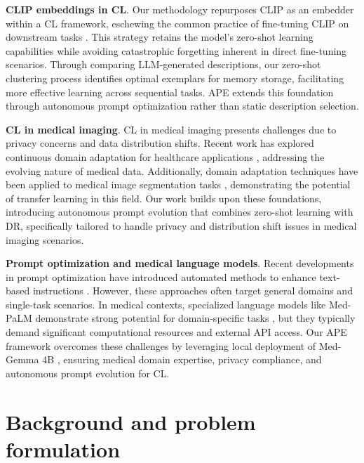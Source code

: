 \documentclass[pdflatex,sn-mathphys-num]{sn-jnl}%
\theoremstyle{thmstyleone}%
\theoremstyle{thmstyletwo}%
\theoremstyle{thmstylethree}%
\begin{document}
\noindent\textbf{CLIP embeddings in CL}. Our methodology repurposes CLIP as an embedder within a CL framework, eschewing the common practice of fine-tuning CLIP on downstream tasks \cite{TiCCLIP}. This strategy retains the model's zero-shot learning capabilities while avoiding catastrophic forgetting inherent in direct fine-tuning scenarios. Through comparing LLM-generated descriptions, our zero-shot clustering process identifies optimal exemplars for memory storage, facilitating more effective learning across sequential tasks. APE extends this foundation through autonomous prompt optimization rather than static description selection.

\noindent\textbf{CL in medical imaging}. CL in medical imaging presents challenges due to privacy concerns and data distribution shifts. Recent work has explored continuous domain adaptation for healthcare applications \cite{venkataramani2018continuousdomainadaptationhealthcare}, addressing the evolving nature of medical data. Additionally, domain adaptation techniques have been applied to medical image segmentation tasks \cite{valindria2018domainadaptationmriorgan}, demonstrating the potential of transfer learning in this field. Our work builds upon these foundations, introducing autonomous prompt evolution that combines zero-shot learning with DR, specifically tailored to handle privacy and distribution shift issues in medical imaging scenarios.

\noindent\textbf{Prompt optimization and medical language models}. Recent developments in prompt optimization have introduced automated methods to enhance text-based instructions \cite{zhou2024systematicsurveypromptengineering}. However, these approaches often target general domains and single-task scenarios. In medical contexts, specialized language models like Med-PaLM \cite{singhal2022largelanguagemodelsclinical} demonstrate strong potential for domain-specific tasks \cite{singhal2023towardsexpertlevelmedical}, but they typically demand significant computational resources and external API access. Our APE framework overcomes these challenges by leveraging local deployment of Med-Gemma 4B \cite{medgemma-hf}, ensuring medical domain expertise, privacy compliance, and autonomous prompt evolution for CL.





\section{Background and problem formulation}
\label{sec:background}
\end{document}
